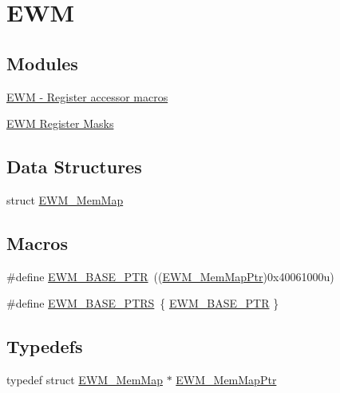 \hypertarget{group___e_w_m___peripheral}{}\section{E\+W\+M}
\label{group___e_w_m___peripheral}
\subsection*{Modules}
\begin{DoxyCompactItemize}
\item 
\hyperlink{group___e_w_m___register___accessor___macros}{E\+W\+M -\/ Register accessor macros}
\item 
\hyperlink{group___e_w_m___register___masks}{E\+W\+M Register Masks}
\end{DoxyCompactItemize}
\subsection*{Data Structures}
\begin{DoxyCompactItemize}
\item 
struct \hyperlink{struct_e_w_m___mem_map}{E\+W\+M\+\_\+\+Mem\+Map}
\end{DoxyCompactItemize}
\subsection*{Macros}
\begin{DoxyCompactItemize}
\item 
\#define \hyperlink{group___e_w_m___peripheral_gae3454b5b37183b746362498d1fafc40c}{E\+W\+M\+\_\+\+B\+A\+S\+E\+\_\+\+P\+T\+R}~((\hyperlink{group___e_w_m___peripheral_ga1de35bc04fc7fa4929507210147339a6}{E\+W\+M\+\_\+\+Mem\+Map\+Ptr})0x40061000u)
\item 
\#define \hyperlink{group___e_w_m___peripheral_ga8b79ee9e363583bee6122ee3da7952b2}{E\+W\+M\+\_\+\+B\+A\+S\+E\+\_\+\+P\+T\+R\+S}~\{ \hyperlink{group___e_w_m___peripheral_gae3454b5b37183b746362498d1fafc40c}{E\+W\+M\+\_\+\+B\+A\+S\+E\+\_\+\+P\+T\+R} \}
\end{DoxyCompactItemize}
\subsection*{Typedefs}
\begin{DoxyCompactItemize}
\item 
typedef struct \hyperlink{struct_e_w_m___mem_map}{E\+W\+M\+\_\+\+Mem\+Map} $\ast$ \hyperlink{group___e_w_m___peripheral_ga1de35bc04fc7fa4929507210147339a6}{E\+W\+M\+\_\+\+Mem\+Map\+Ptr}
\end{DoxyCompactItemize}



